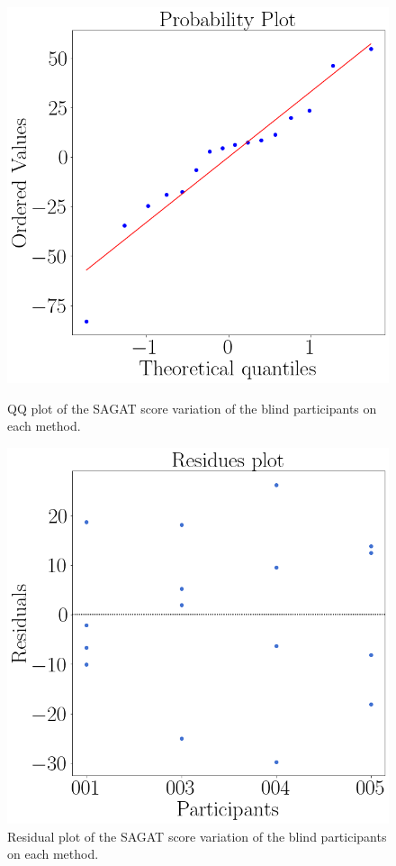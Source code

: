 \begin{figure}[!htb]
    \centering
    \begin{minipage}{0.45\textwidth}
        \centering
        \includegraphics[width = 0.8\linewidth]{Resultados/Sagat/Figuras/png/qqplot_sagat_var_sight.png}
        \caption{QQ plot of the SAGAT score variation of the blind participants on each method.}
        \label{fig:qqplot_sagat_var_blind}
    \end{minipage}
    \begin{minipage}{0.45\textwidth}
        \centering
        \includegraphics[width = 0.8\linewidth]{Resultados/Sagat/Figuras/png/residplot_sagat_var_sight.png}
        \caption{Residual plot of the SAGAT score variation of the blind participants on each method.}
        \label{fig:residplot_sagat_var_blind}
    \end{minipage}
\end{figure}

